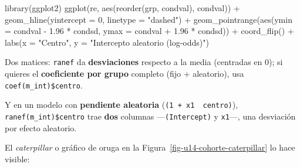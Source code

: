\documentclass[
  letterpaper,
  DIV=11,
  numbers=noendperiod]{scrartcl}
\newenvironment{Shaded}{\begin{snugshade}}{\end{snugshade}}
\newcommand{\AttributeTok}[1]{\textcolor[rgb]{0.40,0.45,0.13}{#1}}
\newcommand{\DecValTok}[1]{\textcolor[rgb]{0.68,0.00,0.00}{#1}}
\newcommand{\FloatTok}[1]{\textcolor[rgb]{0.68,0.00,0.00}{#1}}
\newcommand{\FunctionTok}[1]{\textcolor[rgb]{0.28,0.35,0.67}{#1}}
\newcommand{\NormalTok}[1]{\textcolor[rgb]{0.00,0.23,0.31}{#1}}
\newcommand{\SpecialCharTok}[1]{\textcolor[rgb]{0.37,0.37,0.37}{#1}}
\newcommand{\StringTok}[1]{\textcolor[rgb]{0.13,0.47,0.30}{#1}}
\begin{document}
\begin{tcolorbox}
\begin{Shaded}
\begin{Highlighting}[]
\FunctionTok{library}\NormalTok{(ggplot2)}
\FunctionTok{ggplot}\NormalTok{(re, }\FunctionTok{aes}\NormalTok{(}\FunctionTok{reorder}\NormalTok{(grp, condval), condval)) }\SpecialCharTok{+}
  \FunctionTok{geom\_hline}\NormalTok{(}\AttributeTok{yintercept =} \DecValTok{0}\NormalTok{, }\AttributeTok{linetype =} \StringTok{"dashed"}\NormalTok{) }\SpecialCharTok{+}
  \FunctionTok{geom\_pointrange}\NormalTok{(}\FunctionTok{aes}\NormalTok{(}\AttributeTok{ymin =}\NormalTok{ condval }\SpecialCharTok{{-}} \FloatTok{1.96} \SpecialCharTok{*}\NormalTok{ condsd, }\AttributeTok{ymax =}\NormalTok{ condval }\SpecialCharTok{+} \FloatTok{1.96} \SpecialCharTok{*}\NormalTok{ condsd)) }\SpecialCharTok{+}
  \FunctionTok{coord\_flip}\NormalTok{() }\SpecialCharTok{+}
  \FunctionTok{labs}\NormalTok{(}\AttributeTok{x =} \StringTok{"Centro"}\NormalTok{, }\AttributeTok{y =} \StringTok{"Intercepto aleatorio (log{-}odds)"}\NormalTok{)}
\end{Highlighting}
\end{Shaded}

Dos matices: \texttt{ranef} da \textbf{desviaciones} respecto a la media
(centradas en 0); si quieres el \textbf{coeficiente por grupo} completo
(fijo + aleatorio), usa \texttt{coef(m\_int)\$centro}.

Y en un modelo con \textbf{pendiente aleatoria}
(\texttt{(1\ +\ x1\ \textbar{}\ centro)}),
\texttt{ranef(m\_int)\$centro} trae \textbf{dos} columnas
---\texttt{(Intercept)} y \texttt{x1}---, una desviación por efecto
aleatorio.

\end{tcolorbox}

El \emph{caterpillar} o gráfico de oruga en la
Figura~\ref{fig-u14-cohorte-caterpillar} lo hace visible:
\end{document}
